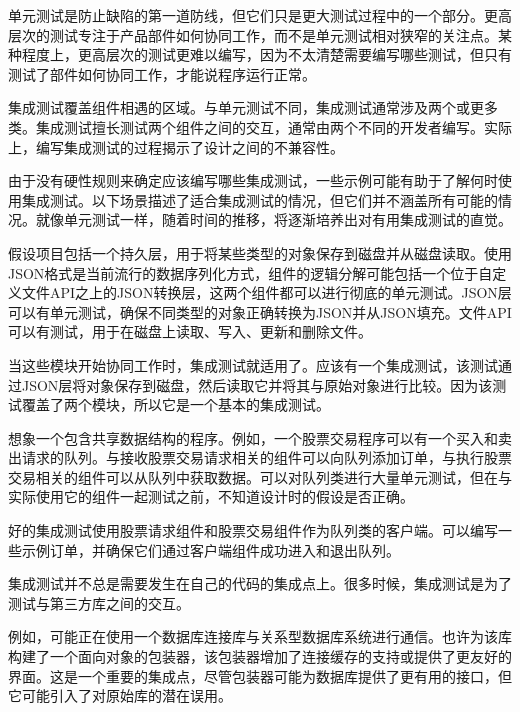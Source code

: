 
单元测试是防止缺陷的第一道防线，但它们只是更大测试过程中的一个部分。更高层次的测试专注于产品部件如何协同工作，而不是单元测试相对狭窄的关注点。某种程度上，更高层次的测试更难以编写，因为不太清楚需要编写哪些测试，但只有测试了部件如何协同工作，才能说程序运行正常。


集成测试覆盖组件相遇的区域。与单元测试不同，集成测试通常涉及两个或更多类。集成测试擅长测试两个组件之间的交互，通常由两个不同的开发者编写。实际上，编写集成测试的过程揭示了设计之间的不兼容性。


由于没有硬性规则来确定应该编写哪些集成测试，一些示例可能有助于了解何时使用集成测试。以下场景描述了适合集成测试的情况，但它们并不涵盖所有可能的情况。就像单元测试一样，随着时间的推移，将逐渐培养出对有用集成测试的直觉。


假设项目包括一个持久层，用于将某些类型的对象保存到磁盘并从磁盘读取。使用JSON格式是当前流行的数据序列化方式，组件的逻辑分解可能包括一个位于自定义文件API之上的JSON转换层，这两个组件都可以进行彻底的单元测试。JSON层可以有单元测试，确保不同类型的对象正确转换为JSON并从JSON填充。文件API可以有测试，用于在磁盘上读取、写入、更新和删除文件。

当这些模块开始协同工作时，集成测试就适用了。应该有一个集成测试，该测试通过JSON层将对象保存到磁盘，然后读取它并将其与原始对象进行比较。因为该测试覆盖了两个模块，所以它是一个基本的集成测试。


想象一个包含共享数据结构的程序。例如，一个股票交易程序可以有一个买入和卖出请求的队列。与接收股票交易请求相关的组件可以向队列添加订单，与执行股票交易相关的组件可以从队列中获取数据。可以对队列类进行大量单元测试，但在与实际使用它的组件一起测试之前，不知道设计时的假设是否正确。

好的集成测试使用股票请求组件和股票交易组件作为队列类的客户端。可以编写一些示例订单，并确保它们通过客户端组件成功进入和退出队列。


集成测试并不总是需要发生在自己的代码的集成点上。很多时候，集成测试是为了测试与第三方库之间的交互。

例如，可能正在使用一个数据库连接库与关系型数据库系统进行通信。也许为该库构建了一个面向对象的包装器，该包装器增加了连接缓存的支持或提供了更友好的界面。这是一个重要的集成点，尽管包装器可能为数据库提供了更有用的接口，但它可能引入了对原始库的潜在误用。

